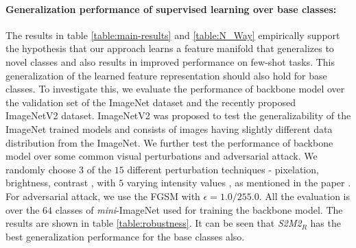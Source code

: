 \documentclass[10pt,twocolumn,letterpaper]{article}
\begin{document}
\begin{table}[t]
\centering
{}
\label{table:validation}
\end{table}
\paragraph{Generalization performance of supervised learning over base classes:}
The results in table \ref{table:main-results} and \ref{table:N_Way} empirically support the hypothesis that our approach learns a feature manifold that generalizes to novel classes and also results in improved performance on few-shot tasks. This generalization of the learned feature representation should also hold for base classes. To investigate this, we evaluate the performance of backbone model over the validation set of the ImageNet dataset and the recently proposed ImageNetV2 dataset\cite{recht2019imagenet}. ImageNetV2 was proposed to test the generalizability of the ImageNet trained models and consists of images having slightly different data distribution from the ImageNet. We further test the performance of backbone model over some common visual perturbations and adversarial attack. We randomly choose $3$ of the $15$ different perturbation techniques - pixelation, brightness, contrast , with $5$ varying intensity values , as mentioned in the paper \cite{hendrycks2019robustness}. For adversarial attack, we use the FGSM \cite{goodfellow2014explaining} with $\epsilon = 1.0/255.0 $. All the evaluation is over the $64$ classes of \textit{mini}-ImageNet used for training the backbone model. The results are shown in table \ref{table:robustness}. It can be seen that \textit{S2M2$_R$} 
has the best generalization performance for the base classes also.
\end{document}
